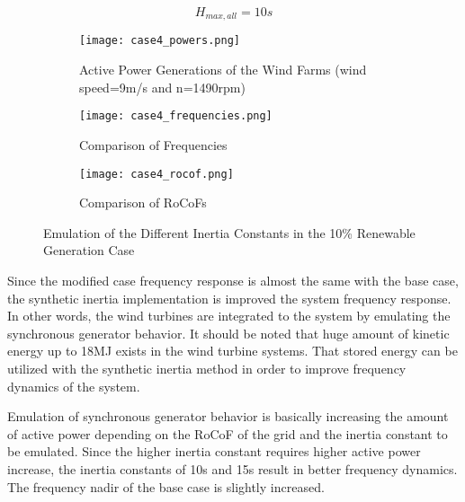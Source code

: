 \begin{equation}
\label{hmax22}
H_{max,all}=10s
\end{equation}
\begin{figure}[h!]
	\centering
\begin{subfigure}{0.9\textwidth}
	\centering	
	\texttt{[image: case4\_powers.png]}
	\caption{Active Power Generations of the Wind Farms (wind speed=9m/s and n=1490rpm)}
	\label{Case4_power}	
\end{subfigure}
	
\vspace{0.1em} %
\begin{subfigure}{0.9\textwidth} %
	\centering	\texttt{[image: case4\_frequencies.png]}
	\caption{Comparison of Frequencies}		
	\label{Case4_freq}
\end{subfigure}
	\vspace{0.1em} %
	\begin{subfigure}{0.9\textwidth}
		\centering	\texttt{[image: case4\_rocof.png]}
		\caption{Comparison of RoCoFs}
		\label{Case4_rocof}	
	\end{subfigure}
	\caption{Emulation of the Different Inertia Constants in the 10\% Renewable Generation Case}
\end{figure}
Since the modified case frequency response is almost the same with the base case, the synthetic inertia implementation is improved the system frequency response. In other words, the wind turbines are integrated to the system by emulating the synchronous generator behavior. It should be noted that huge amount of kinetic energy up to 18MJ exists in the wind turbine systems. That stored energy can be utilized with the synthetic inertia method in order to improve frequency dynamics of the system. \par
Emulation of synchronous generator behavior is basically increasing the amount of active power depending on the RoCoF of the grid and the inertia constant to be emulated. Since the higher inertia constant requires higher active power increase, the inertia constants of 10s and 15s result in better frequency dynamics. The frequency nadir of the base case is slightly increased. \par
